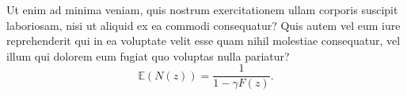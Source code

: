 Ut enim ad minima veniam, quis nostrum exercitationem ullam corporis suscipit laboriosam, nisi ut aliquid ex ea commodi consequatur? Quis autem vel eum iure reprehenderit qui in ea voluptate velit esse quam nihil molestiae consequatur, vel illum qui dolorem eum fugiat quo voluptas nulla pariatur? 
\begin{equation}
\mathbb{E}(N(z)) = \frac{1}{1-\gamma F(z)}.
\label{e:experiments}\end{equation}

